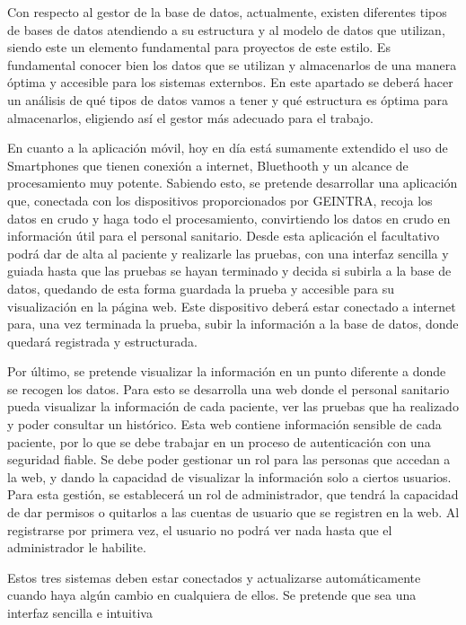 \documentclass[12pt,oneside,a4paper]{article}
\begin{document}
Con respecto al gestor de la base de datos, actualmente, existen diferentes tipos de bases de datos atendiendo a su estructura y al modelo de datos que utilizan, siendo este un elemento fundamental para proyectos de este estilo. Es fundamental conocer bien los datos que se utilizan y almacenarlos de una manera óptima y accesible para los sistemas externbos. En este apartado se deberá hacer un análisis de qué tipos de datos vamos a tener y qué estructura es óptima para almacenarlos, eligiendo así el gestor más adecuado para el trabajo.

En cuanto a la aplicación móvil, hoy en día está sumamente extendido el uso de Smartphones que tienen conexión a internet, Bluethooth y un alcance de procesamiento muy potente. Sabiendo esto, se pretende desarrollar una aplicación que, conectada con los dispositivos proporcionados por GEINTRA, recoja los datos en crudo y haga todo el procesamiento, convirtiendo los datos en crudo en información útil para el personal sanitario. Desde esta aplicación el facultativo podrá dar de alta al paciente y realizarle las pruebas, con una interfaz sencilla y guiada hasta que las pruebas se hayan terminado y decida si subirla a la base de datos, quedando de esta forma guardada la prueba y accesible para su visualización en la página web. Este dispositivo deberá estar conectado a internet para, una vez terminada la prueba, subir la información a la base de datos, donde quedará registrada y estructurada.

Por último, se pretende visualizar la información en un punto diferente a donde se recogen los datos. Para esto se desarrolla una web donde el personal sanitario pueda visualizar la información de cada paciente, ver las pruebas que ha realizado y poder consultar un histórico. Esta web contiene información sensible de cada paciente, por lo que se debe trabajar en un proceso de autenticación con una seguridad fiable. Se debe poder gestionar un rol para las personas que accedan a la web, y dando la capacidad de visualizar la información solo a ciertos usuarios. Para esta gestión, se establecerá un rol de administrador, que tendrá la capacidad de dar permisos o quitarlos a las cuentas de usuario que se registren en la web. Al registrarse por primera vez, el usuario no podrá ver nada hasta que el administrador le habilite.

Estos tres sistemas deben estar conectados y actualizarse automáticamente cuando haya algún cambio en cualquiera de ellos. Se pretende que sea una interfaz sencilla e intuitiva
\end{document}
